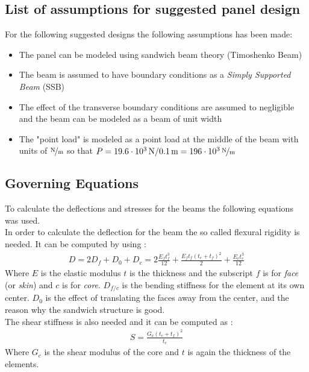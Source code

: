 \documentclass[10pt,a4paper,20pt]{article}
\begin{document}
\subsection{List of assumptions for suggested panel design}
For the following suggested designs the following assumptions has been made:
\begin{itemize}
	\item The panel can be modeled using sandwich beam theory (Timoshenko Beam)
	\item The beam is assumed to have boundary conditions as a \textit{Simply Supported Beam} (SSB)
	\item The effect of the transverse boundary conditions are assumed to negligible and the beam can be modeled as a beam of unit width
	\item The "point load" is modeled as a point load at the middle of the beam with units of $\unitfrac{N}{m}$ so that $P=\unit[19.6\cdot10^3]{N}/\unit[0.1]{m} =\unitfrac[196\cdot10^3]{N}{m}$
\end{itemize}

\subsection{Governing Equations}
To calculate the deflections and stresses for the beams the following equations was used. \\
In order to calculate the deflection for the beam the so called flexural rigidity is needed. It can be computed by using \cite[p. 3.2 eq. 3.4]{IntroSW}:
\begin{align}
D = 2D_f + D_0 + D_c = 2\frac{E_f t_f^3}{12}+ \frac{E_f t_f \left(t_c+t_f\right)^2}{2} + \frac{E_c t_c^3}{12}
\end{align}
Where $E$ is the elastic modulus $t$ is the thickness and the subscript $f$ is for \textit{face} (or \textit{skin}) and $c$ is for \textit{core}. $D_{f/c}$ is the  bending stiffness for the element at its own center. $D_0$ is the effect of translating the faces away from the center, and the reason why the sandwich structure is good. \\
The shear stiffness is also needed and it can be computed as \cite[p. 4.3 eq. 4.6]{IntroSW}:
\begin{align}
S = \frac{G_c (t_c+t_f)^2}{t_c}
\end{align}
Where $G_c$ is the shear modulus of the core and $t$ is again the thickness of the elements. 
\end{document}
